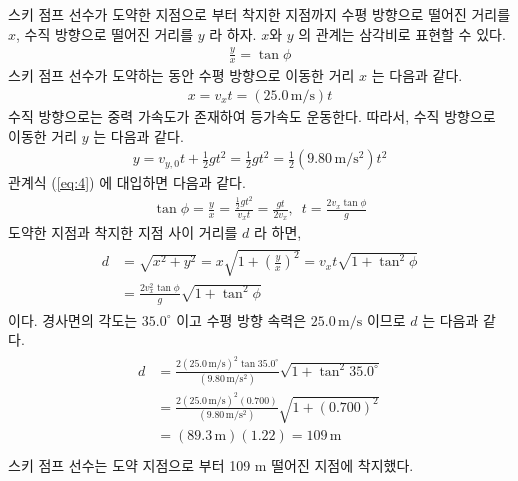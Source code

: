 \documentclass[floatfix,nofootinbib,superscriptaddress,fleqn,preprint]{revtex4}
\begin{document}
 스키 점프 선수가 도약한 지점으로 부터 착지한 지점까지 
수평 방향으로 떨어진 거리를 $x$, 수직 방향으로 떨어진 거리를 $y$ 라 하자.
$x$와 $y$ 의 관계는 삼각비로 표현할 수 있다.
\begin{align}\label{eq:4}
  \frac{y}{x}=\tan{\phi}
\end{align}
스키 점프 선수가 도약하는 동안 수평 방향으로 이동한 거리 $x$ 는 다음과 같다.
\begin{align}
  x=v_xt=(25.0\,\mathrm{m/s})t 
\end{align}
수직 방향으로는 중력 가속도가 존재하여 등가속도 운동한다. 따라서, 수직 방향으로
이동한 거리 $y$ 는 다음과 같다.
\begin{align}
  y=v_{y,0}t+\frac{1}{2}gt^2=\frac{1}{2}gt^2=\frac{1}{2}(9.80\,\mathrm{m/s^2})t^2
\end{align}
관계식 (\ref{eq:4}) 에 대입하면 다음과 같다.
\begin{align}
  \tan{\phi} = \frac{y}{x} = \frac{\frac{1}{2}gt^2}{v_xt}=\frac{gt}{2v_x},\,\,\,
  t=\frac{2v_x\tan{\phi}}{g}
\end{align}
도약한 지점과 착지한 지점 사이 거리를 $d$ 라 하면, 
\begin{align}
  \begin{split}
    d&=\sqrt{x^2+y^2}=x\sqrt{1+\left(\frac{y}{x}\right)^2}=v_xt\sqrt{1+\tan^2{\phi}} \\
    &=\frac{2v_x^2\tan{\phi}}{g}\sqrt{1+\tan^2{\phi}}
  \end{split}
\end{align}
이다.
경사면의 각도는 $35.0^\circ$ 이고 수평 방향 속력은 $25.0\,\mathrm{m/s}$ 이므로 $d$ 는
다음과 같다.
\begin{align}
  \begin{split}
    d&=\frac{2(25.0\,\mathrm{m/s})^2\tan{35.0^\circ}}{(9.80\,\mathrm{m/s^2})}\sqrt{1+\tan^2{35.0^\circ}} \\
    &= \frac{2(25.0\,\mathrm{m/s})^2 (0.700)}{(9.80\,\mathrm{m/s^2})}\sqrt{1+(0.700)^2} \\
    &= (89.3\,\mathrm{m})(1.22) = 109\,\mathrm{m} \\
  \end{split}
\end{align}
스키 점프 선수는 도약 지점으로 부터 109 m 떨어진 지점에 착지했다.

\vspace{2cm}
\end{document}
